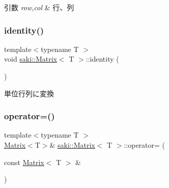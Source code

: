 \begin{DoxyParams}{引数}
{\em row,col} & 行、列 \\
\hline
\end{DoxyParams}
\mbox{\label{classsaki_1_1_matrix_af0c4f3614c29e27eae5fecde22140be8}} 
\subsubsection{\texorpdfstring{identity()}{identity()}}
{\footnotesize\ttfamily template$<$typename T $>$ \\
void \mbox{\hyperlink{classsaki_1_1_matrix}{saki\+::\+Matrix}}$<$ T $>$\+::identity (\begin{DoxyParamCaption}{ }\end{DoxyParamCaption})\hspace{0.3cm}{\ttfamily [inline]}}



単位行列に変換 

\mbox{\label{classsaki_1_1_matrix_af83ebe0a4f4652fbf30dd64307021603}} 
\subsubsection{\texorpdfstring{operator=()}{operator=()}\hspace{0.1cm}{\footnotesize\ttfamily [1/2]}}
{\footnotesize\ttfamily template$<$typename T $>$ \\
\mbox{\hyperlink{classsaki_1_1_matrix}{Matrix}}$<$T$>$\& \mbox{\hyperlink{classsaki_1_1_matrix}{saki\+::\+Matrix}}$<$ T $>$\+::operator= (\begin{DoxyParamCaption}\item[{const \mbox{\hyperlink{classsaki_1_1_matrix}{Matrix}}$<$ T $>$ \&}]{ }\end{DoxyParamCaption})\hspace{0.3cm}{\ttfamily [default]}}

\mbox{\label{classsaki_1_1_matrix_a96b3519d691108a606d4ece3a9bac134}} 
